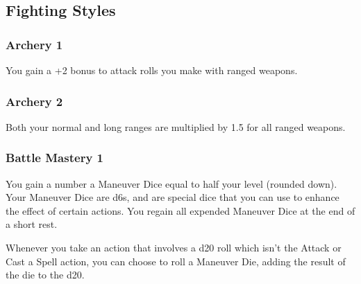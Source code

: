 
\subsection*{Fighting Styles} \label{ssec::fightingstyles}
    \subsubsection{Archery 1}
        You gain a +2 bonus to attack rolls you make with ranged weapons.
    \subsubsection{Archery 2}
        Both your normal and long ranges are multiplied by 1.5 for all ranged weapons.
    \subsubsection{Battle Mastery 1}
        You gain a number a Maneuver Dice equal to half your level (rounded down).
        Your Maneuver Dice are d6s, and are special dice that you can use to enhance the effect of certain actions.
        You regain all expended Maneuver Dice at the end of a short rest.

        Whenever you take an action that involves a d20 roll which isn't the Attack or Cast a Spell action, you can choose to roll a Maneuver Die, adding the result of the die to the d20.
